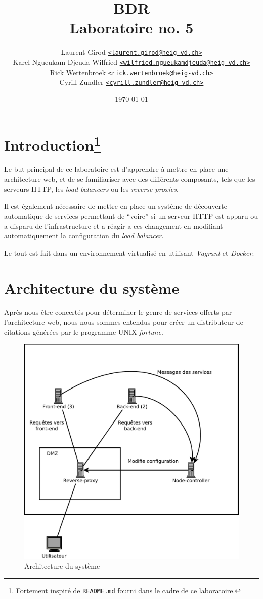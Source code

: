 \documentclass[a4paper,11pt,titlepage]{article}
\author{Laurent Girod \href{mailto:laurent.girod@heig-vd.ch}{\texttt{<laurent.girod@heig-vd.ch>}}\\
	Karel Ngueukam Djeuda Wilfried \href{wilfried.ngueukamdjeuda@heig-vd.ch}{\texttt{<wilfried.ngueukamdjeuda@heig-vd.ch>}}\\
	Rick Wertenbroek \href{mailto:rick.wertenbroek@heig-vd.ch}{\texttt{<rick.wertenbroek@heig-vd.ch>}}\\
	Cyrill Zundler \href{mailto:cyrill.zundler@heig-vd.ch}{\texttt{<cyrill.zundler@heig-vd.ch>}}
}
\date{\today}
\title{BDR\\Laboratoire no. 5}
\begin{document}
\maketitle
\tableofcontents
\newpage

\section[Introduction]{Introduction\protect\footnote{Fortement inspiré de \texttt{README.md} fourni dans le cadre de ce laboratoire.}}
Le but principal de ce laboratoire est d'apprendre à mettre en place une architecture web, et de se familiariser avec
des différents composants, tels que les serveurs HTTP, les \emph{load balancers} ou les \emph{reverse proxies}.

Il est également nécessaire de mettre en place un système de découverte automatique de services permettant de ``voire''
si un serveur HTTP est apparu ou a disparu de l'infrastructure et a réagir a ces changement en modifiant
automatiquement la configuration du \emph{load balancer}.

Le tout est fait dans un environnement virtualisé en utilisant \emph{Vagrant} et \emph{Docker}. 

\section{Architecture du système}
Après nous être concertés pour déterminer le genre de services offerts par l'architecture web, nous nous sommes entendus
pour créer un distributeur de citations générées par le programme UNIX \emph{fortune}.
\begin{figure}[h!]
	\centering
	\includegraphics[scale=0.5]{schema.pdf}
	\caption{Architecture du système}
\end{figure}
\end{document}
